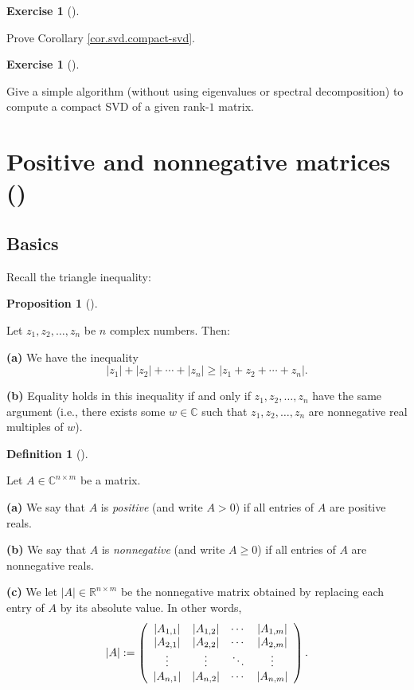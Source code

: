 \documentclass[numbers=enddot,12pt,final,onecolumn,notitlepage]{scrartcl}%
\newcounter{exer}
\numberwithin{exer}{subsection}
\theoremstyle{definition}
\newtheorem{prop}[theo]{Proposition}
\newenvironment{proposition}[1][]
{\begin{prop}[#1]\begin{leftbar}}
{\end{leftbar}\end{prop}}
\newtheorem{defi}[theo]{Definition}
\newenvironment{definition}[1][]
{\begin{defi}[#1]\begin{leftbar}}
{\end{leftbar}\end{defi}}
\newtheorem{exmp}[exer]{Exercise}
\newenvironment{exercise}[1][]
{\begin{exmp}[#1]\begin{leftbar}}
{\end{leftbar}\end{exmp}}
\begin{document}
\begin{exercise}
 Prove Corollary \ref{cor.svd.compact-svd}.
\end{exercise}

\begin{exercise}
 Give a simple algorithm (without using eigenvalues or spectral
decomposition) to compute a compact SVD of a given rank-$1$ matrix.
\end{exercise}

\section{Positive and nonnegative matrices (\cite[Chapter 8]{HorJoh13})}

\subsection{Basics}

Recall the triangle inequality:

\begin{proposition}
[triangle inequality]\label{prop.ineq.triangle-CC}Let $z_{1},z_{2}%
,\ldots,z_{n}$ be $n$ complex numbers. Then: \medskip

\textbf{(a)} We have the inequality%
\[
\left\vert z_{1}\right\vert +\left\vert z_{2}\right\vert +\cdots+\left\vert
z_{n}\right\vert \geq\left\vert z_{1}+z_{2}+\cdots+z_{n}\right\vert .
\]


\textbf{(b)} Equality holds in this inequality if and only if $z_{1}%
,z_{2},\ldots,z_{n}$ have the same argument (i.e., there exists some
$w\in\mathbb{C}$ such that $z_{1},z_{2},\ldots,z_{n}$ are nonnegative real
multiples of $w$).
\end{proposition}

\begin{definition}
\label{def.posmat.pos-nonneg}Let $A\in\mathbb{C}^{n\times m}$ be a matrix.
\medskip

\textbf{(a)} We say that $A$ is \emph{positive} (and write $A>0$) if all
entries of $A$ are positive reals. \medskip

\textbf{(b)} We say that $A$ is \emph{nonnegative} (and write $A\geq0$) if all
entries of $A$ are nonnegative reals. \medskip

\textbf{(c)} We let $\left\vert A\right\vert \in\mathbb{R}^{n\times m}$ be the
nonnegative matrix obtained by replacing each entry of $A$ by its absolute
value. In other words,%
\[
\left\vert A\right\vert :=\left(
\begin{array}
[c]{cccc}%
\left\vert A_{1,1}\right\vert  & \left\vert A_{1,2}\right\vert  & \cdots &
\left\vert A_{1,m}\right\vert \\
\left\vert A_{2,1}\right\vert  & \left\vert A_{2,2}\right\vert  & \cdots &
\left\vert A_{2,m}\right\vert \\
\vdots & \vdots & \ddots & \vdots\\
\left\vert A_{n,1}\right\vert  & \left\vert A_{n,2}\right\vert  & \cdots &
\left\vert A_{n,m}\right\vert
\end{array}
\right)  .
\]

\end{definition}
\end{document}
